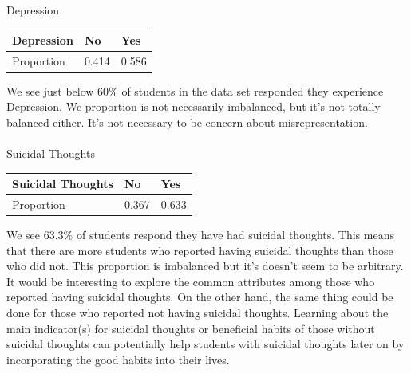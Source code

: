 \documentclass[
  letterpaper,
  DIV=11,
  numbers=noendperiod]{scrartcl}
\makeatletter
\let\oldparagraph\paragraph
\renewcommand{\paragraph}{
    \@ifstar
      \xxxParagraphStar
      \xxxParagraphNoStar
  }
\newcommand{\xxxParagraphStar}[1]{\oldparagraph*{#1}\mbox{}}
\newcommand{\xxxParagraphNoStar}[1]{\oldparagraph{#1}\mbox{}}
\newenvironment{Shaded}{\begin{snugshade}}{\end{snugshade}}
\newcommand{\AttributeTok}[1]{\textcolor[rgb]{0.40,0.45,0.13}{#1}}
\newcommand{\DecValTok}[1]{\textcolor[rgb]{0.68,0.00,0.00}{#1}}
\newcommand{\FunctionTok}[1]{\textcolor[rgb]{0.28,0.35,0.67}{#1}}
\newcommand{\NormalTok}[1]{\textcolor[rgb]{0.00,0.23,0.31}{#1}}
\newcommand{\SpecialCharTok}[1]{\textcolor[rgb]{0.37,0.37,0.37}{#1}}
\makeatother
\begin{document}
\paragraph{Depression}\label{depression}

\begin{Shaded}
\end{Shaded}

\begin{longtable}[]{@{}lll@{}}
\toprule\noalign{}
Depression & No & Yes \\
\midrule\noalign{}
\endhead
\bottomrule\noalign{}
\endlastfoot
Proportion & 0.414 & 0.586 \\
\end{longtable}

We see just below 60\% of students in the data set responded they
experience Depression. We proportion is not necessarily imbalanced, but
it's not totally balanced either. It's not necessary to be concern about
misrepresentation.

\paragraph{Suicidal Thoughts}\label{suicidal-thoughts}

\begin{Shaded}
\end{Shaded}

\begin{longtable}[]{@{}lll@{}}
\toprule\noalign{}
Suicidal Thoughts & No & Yes \\
\midrule\noalign{}
\endhead
\bottomrule\noalign{}
\endlastfoot
Proportion & 0.367 & 0.633 \\
\end{longtable}

We see 63.3\% of students respond they have had suicidal thoughts. This
means that there are more students who reported having suicidal thoughts
than those who did not. This proportion is imbalanced but it's doesn't
seem to be arbitrary. It would be interesting to explore the common
attributes among those who reported having suicidal thoughts. On the
other hand, the same thing could be done for those who reported not
having suicidal thoughts. Learning about the main indicator(s) for
suicidal thoughts or beneficial habits of those without suicidal
thoughts can potentially help students with suicidal thoughts later on
by incorporating the good habits into their lives.
\end{document}

